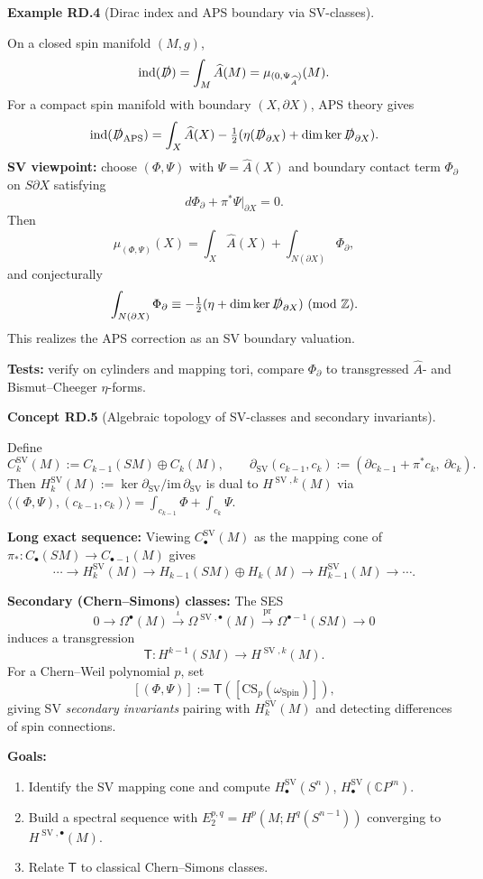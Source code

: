 \documentclass[10pt, letterpaper]{article}
\newcommand{\Spin}{\mathrm{Spin}}
\newcommand{\CustomHeading}[3]{%
  \par\medskip\noindent%
  \textbf{#1 #2} \textnormal{(#3)}.\enskip%
}
\newenvironment{EXA}[2]{\begin{unitbox}\CustomHeading{Example}{#1}{#2}}{\end{unitbox}}
\newenvironment{CONC}[2]{\begin{unitbox}\CustomHeading{Concept}{#1}{#2}}{\end{unitbox}}
\begin{document}
\begin{EXA}{RD.4}{Dirac index and APS boundary via SV-classes}
On a closed spin manifold $(M,g)$,
\[
\mathrm{ind}(\slashed D)=\int_M\widehat A(M)=\mu_{(0,\Psi_{\widehat A})}(M).
\]
For a compact spin manifold with boundary $(X,\partial X)$, APS theory gives
\[
\mathrm{ind}(\slashed D_{\operatorname{APS}})
=\int_X\widehat A(X)
-\tfrac12(\eta(\slashed D_{\partial X})+\dim\ker\slashed D_{\partial X}).
\]
\textbf{SV viewpoint:}
choose $(\Phi,\Psi)$ with $\Psi=\widehat A(X)$ and boundary contact term $\Phi_{\partial}$ on $S\partial X$ satisfying
\[
d\Phi_{\partial}+\pi^*\Psi|_{\partial X}=0.
\]
Then
\[
\mu_{(\Phi,\Psi)}(X)=\int_X\widehat A(X)+\int_{N(\partial X)}\Phi_{\partial},
\]
and conjecturally
\[
\int_{N(\partial X)}\Phi_{\partial}
\equiv-\tfrac12(\eta+\dim\ker\slashed D_{\partial X})\ (\mathrm{mod}\ \mathbb Z).
\]
This realizes the APS correction as an SV boundary valuation.

\textbf{Tests:} verify on cylinders and mapping tori, compare $\Phi_{\partial}$ to transgressed $\widehat A$- and Bismut–Cheeger $\hat\eta$-forms.
\end{EXA}

\begin{CONC}{RD.5}{Algebraic topology of SV-classes and secondary invariants}
Define
\[
C_k^{\operatorname{SV}}(M):=C_{k-1}(SM)\oplus C_k(M),
\qquad
\partial_{\operatorname{SV}}(c_{k-1},c_k):=(\partial c_{k-1}+\pi^*c_k,\ \partial c_k).
\]
Then $H_k^{\operatorname{SV}}(M):=\ker\partial_{\operatorname{SV}}/\mathrm{im}\,\partial_{\operatorname{SV}}$ is dual to $H^{\operatorname{SV},k}(M)$ via
$\langle(\Phi,\Psi),(c_{k-1},c_k)\rangle=\int_{c_{k-1}}\Phi+\int_{c_k}\Psi$.

\textbf{Long exact sequence:}
Viewing $C_\bullet^{\operatorname{SV}}(M)$ as the mapping cone of $\pi_*:C_\bullet(SM)\to C_{\bullet-1}(M)$ gives
\[
\cdots\to H_k^{\operatorname{SV}}(M)
\to H_{k-1}(SM)\oplus H_k(M)
\to H_{k-1}^{\operatorname{SV}}(M)\to\cdots.
\]

\textbf{Secondary (Chern–Simons) classes:}
The SES
\[
0\to\Omega^\bullet(M)\xrightarrow{\iota}\Omega^{\operatorname{SV},\bullet}(M)\xrightarrow{\mathrm{pr}}\Omega^{\bullet-1}(SM)\to0
\]
induces a transgression
\[
\mathsf T:H^{k-1}(SM)\to H^{\operatorname{SV},k}(M).
\]
For a Chern–Weil polynomial $p$, set
\[
[(\Phi,\Psi)]:=\mathsf T([\mathrm{CS}_p(\omega_{\Spin})]),
\]
giving SV \emph{secondary invariants} pairing with $H_k^{\operatorname{SV}}(M)$ and detecting differences of spin connections.

\textbf{Goals:}
\begin{enumerate}[label=(\roman*)]
\item Identify the SV mapping cone and compute $H_\bullet^{\operatorname{SV}}(S^n)$, $H_\bullet^{\operatorname{SV}}(\mathbb CP^m)$.
\item Build a spectral sequence with $E_2^{p,q}=H^p(M;H^q(S^{n-1}))$ converging to $H^{\operatorname{SV},\bullet}(M)$.
\item Relate $\mathsf T$ to classical Chern–Simons classes.
\end{enumerate}
\end{CONC}
\end{document}
